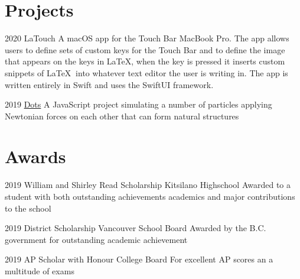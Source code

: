 \documentclass[]{style}
\begin{document}
\section{Projects}

\begin{entrylist}


\entry
{2020}
{LaTouch}
{}
{A macOS app for the Touch Bar MacBook Pro. The app allows users to define sets of custom keys for the Touch Bar and to define the image that appears on the keys in \LaTeX, when the key is pressed it inserts custom snippets of \LaTeX $\:$ into whatever text editor the user is writing in. The app is written entirely in Swift and uses the SwiftUI framework.}


\entry
{2019}
{\href{https://sachagoldman.com/dots/}{Dots}}
{}
{A JavaScript project simulating a number of particles applying Newtonian forces on each other that can form natural structures}


\end{entrylist}



\section{Awards}

\begin{entrylist}


\entry
{2019}
{William and Shirley Read Scholarship}
{Kitsilano Highschool}
{Awarded to a student with both outstanding achievements academics and major contributions to the school}


\entry
{2019}
{District Scholarship}
{Vancouver School Board}
{Awarded by the B.C. government for outstanding academic achievement}

\entry
{2019}
{AP Scholar with Honour}
{College Board}
{For excellent AP scores an a multitude of exams}


\end{entrylist}
\end{document}
